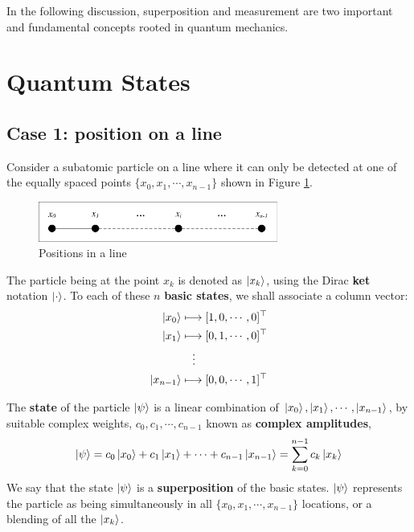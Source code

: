 \documentclass{easyclass}
\begin{document}
In the following discussion, superposition and measurement are two important and fundamental concepts rooted in quantum mechanics.

\section{Quantum States}
\subsection{Case 1: position on a line}
Consider a subatomic particle on a line where it can only be detected at one of the equally spaced points $\{x_0, x_1, \cdots , x_{n-1}\}$ shown in Figure \ref{fig:positions-in-a-line}. 

\begin{figure}[h]
	\centering
	\includegraphics[width=0.7\textwidth]{figures/line-position.pdf}
	\caption{Positions in a line}
	\label{fig:positions-in-a-line}
\end{figure}

The particle being at the point $x_k$ is denoted as $\ket{x_k}$, using the Dirac \textbf{ket} notation $\ket{\cdot}$. To each of these $n$ \textbf{basic states}, we shall associate a column vector:
\begin{equation}
	\begin{aligned}
		\ket{x_0} 	&\longmapsto  [1,0,\cdots,0]^{\top}\\
		\ket{x_1} 	&\longmapsto  [0,1,\cdots,0]^{\top}\\
		&\quad \vdots\\
		\ket{x_{n-1}} 	&\longmapsto  [0,0,\cdots,1]^{\top}		
	\end{aligned}
\end{equation}

The \textbf{state} of the particle $\ket{\psi}$ is a linear combination of $\ket{x_0}, \ket{x_1}, \cdots, \ket{x_{n-1}}$, by suitable complex weights, $c_0, c_1, \cdots, c_{n-1}$ known as \textbf{complex amplitudes},
\begin{equation}
	\ket{\psi}=c_0\ket{x_0}+c_1\ket{x_1}+\cdots+c_{n-1}\ket{x_{n-1}}=\sum_{k=0}^{n-1}c_k\ket{x_k}
\end{equation}
We say that the state $\ket{\psi}$ is a \textbf{superposition} of the basic states. $\ket{\psi}$ represents the particle as being simultaneously in all $\{x_0, x_1, \cdots, x_{n-1}\}$ locations, or a blending of all the $\ket{x_k}$. 
\end{document}
